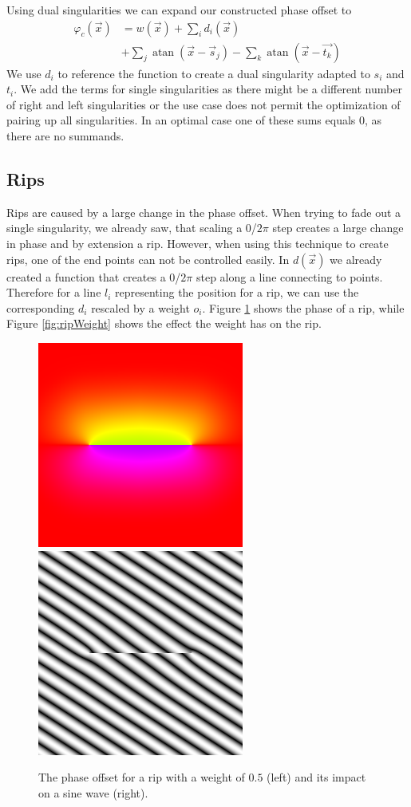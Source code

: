 \documentclass{utue} %
\DeclareMathOperator{\atan}{atan}
\begin{document}
Using dual singularities we can expand our constructed phase offset to
\begin{align*}
  \varphi_c(\vec{x})&=w(\vec{x}) +\sum_i d_i(\vec{x})\\
  & + \sum_j \atan(\vec{x}-\vec{s}_j) - \sum_k \atan(\vec{x}-\vec{t_k})
\end{align*}
We use $d_i$ to reference the function to create a dual singularity adapted to $s_i$ and $t_i$. We add the terms for single singularities as there might be a different number of right and left singularities or the use case does not permit the optimization of pairing up all singularities. In an optimal case one of these sums equals $0$, as there are no summands.

\subsection{Rips}
Rips are caused by a large change in the phase offset. When trying to fade out a single singularity, we already saw, that scaling a $0$/$2\pi$ step creates a large change in phase and by extension a rip. However, when using this technique to create rips, one of the end points can not be controlled easily. In $d(\vec{x})$ we already created a function that creates a $0$/$2\pi$ step along a line connecting to points. Therefore for a line $l_i$ representing the position for a rip, we can use the corresponding $d_i$ rescaled by a weight $o_i$. Figure \ref{fig:ripPhase} shows the phase of a rip, while Figure \ref{fig:ripWeight} shows the effect the weight has on the rip.

\begin{figure}[ht]
  \centering
  \includegraphics[width=0.45\linewidth]{images/ripPhase}
  \includegraphics[width=0.45\linewidth]{images/rip05}
  \caption{The phase offset for a rip with a weight of $0.5$ (left) and its impact on a sine wave (right).}\label{fig:ripPhase}
\end{figure}
\end{document}
